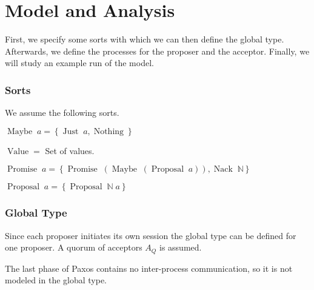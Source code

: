 \chapter{Model and Analysis}
First, we specify some sorts with which we can then define the global type.
Afterwards, we define the processes for the proposer and the acceptor.
Finally, we will study an example run of the model.

\subsection{Sorts}
\newcommand{\Maybe}[1]{\operatorname{Maybe}\; #1}
\newcommand{\Just}[1]{\operatorname{Just}\; #1}
\newcommand{\Nothing}[0]{\operatorname{Nothing}}
\newcommand{\Or}[0]{\; | \;}
\newcommand{\Promise}[1]{\operatorname{Promise}\; #1}
\newcommand{\Proposal}[1]{\operatorname{Proposal}\; #1}
\newcommand{\ProposalC}[2]{\operatorname{Proposal}\; #1\; #2}
\newcommand{\Nack}[1]{\operatorname{Nack}\; #1}
\newcommand{\Value}[0]{\operatorname{Value}}

\newcommand{\Sort}[1]{\left\{#1\right\}}
\newcommand{\Paren}[1]{\left(#1\right)}

We assume the following sorts.

$\Maybe{a} = \Sort{\Just{a}, \Nothing}$

$\Value =$ Set of values.

$\Promise{a} = \Sort{\Promise{\Paren{\Maybe{\Paren{\Proposal{a}}}}}, \Nack{\mathbb{N}}}$

$\Proposal{a} = \Sort{\ProposalC{\mathbb{N}}{a}}$

\subsection{Global Type}
\newcommand{\DotForall}[1]{\bigodot_{#1}\;}
\newcommand{\SendUnreliableG}[4]{#1 \to_u #2 : #3 \left\langle #4 \right\rangle}
\newcommand{\SendWeaklyG}[3]{#1 \to_w #2 : #3}

\newcommand{\Accept}[0]{\mathnormal{Accept}}
\newcommand{\Restart}[0]{\mathnormal{Restart}}
\newcommand{\Abort}[0]{\mathnormal{Abort}}

\newcommand{\Mu}[1]{\left(\mu #1\right)}

Since each proposer initiates its own session the global type can be defined for one proposer.
A quorum of acceptors $A_Q$ is assumed.

The last phase of Paxos contains no inter-process communication, so it is not modeled in the global type.

